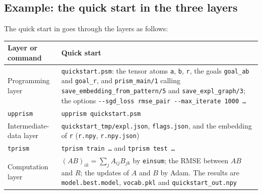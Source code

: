 \documentclass[a4paper]{report}
\begin{document}
\subsection*{Example: the quick start in the three layers}
The quick start in  goes through the layers as follows:
\begin{center}
	\small
	\begin{tabular}{P{3.0cm}P{11.0cm}}
		\toprule
		Layer or command & Quick start \\
		\midrule
		Programming layer & {\tt quickstart.psm}: the tensor atoms {\tt a}, {\tt b}, {\tt r}, the goals
		{\tt goal\_ab} and {\tt goal\_r}, and {\tt prism\_main/1} calling
		{\tt save\_embedding\_from\_pattern/5} and {\tt save\_expl\_graph/3};
		the options {\tt -{}-sgd\_loss rmse\_pair -{}-max\_iterate 1000 \ldots} \\
		{\tt upprism} & {\tt upprism quickstart.psm} \\
		Intermediate-data layer & {\tt quickstart\_tmp/expl.json}, {\tt flags.json}, and the embedding of
		{\tt r} ({\tt r.npy}, {\tt r.npy.json}) \\
		{\tt tprism} & {\tt tprism train \ldots} and {\tt tprism test \ldots} \\
		Computation layer & $(AB)_{ik}=\sum_j A_{ij}B_{jk}$ by {\tt einsum}; the RMSE between $AB$ and $R$;
		the updates of $A$ and $B$ by Adam.  The results are {\tt model.best.model},
		{\tt vocab.pkl} and {\tt quickstart\_out.npy} \\
		\bottomrule
	\end{tabular}
\end{center}
\end{document}
